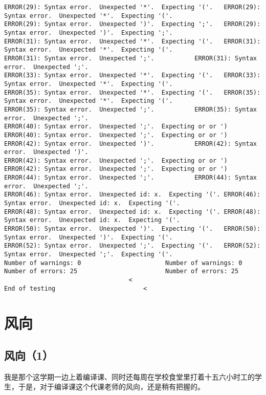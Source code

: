 \documentclass[12pt]{book}
\begin{document}
\begin{lstlisting}
ERROR(29): Syntax error.  Unexpected '*'.  Expecting '('.	ERROR(29): Syntax error.  Unexpected '*'.  Expecting '('.
ERROR(29): Syntax error.  Unexpected ')'.  Expecting ';'.	ERROR(29): Syntax error.  Unexpected ')'.  Expecting ';'.
ERROR(31): Syntax error.  Unexpected '*'.  Expecting '('.	ERROR(31): Syntax error.  Unexpected '*'.  Expecting '('.
ERROR(31): Syntax error.  Unexpected ';'.			ERROR(31): Syntax error.  Unexpected ';'.
ERROR(33): Syntax error.  Unexpected '*'.  Expecting '('.	ERROR(33): Syntax error.  Unexpected '*'.  Expecting '('.
ERROR(35): Syntax error.  Unexpected '*'.  Expecting '('.	ERROR(35): Syntax error.  Unexpected '*'.  Expecting '('.
ERROR(35): Syntax error.  Unexpected ';'.			ERROR(35): Syntax error.  Unexpected ';'.
ERROR(40): Syntax error.  Unexpected ';'.  Expecting or or ')	ERROR(40): Syntax error.  Unexpected ';'.  Expecting or or ')
ERROR(42): Syntax error.  Unexpected ')'.			ERROR(42): Syntax error.  Unexpected ')'.
ERROR(42): Syntax error.  Unexpected ';'.  Expecting or or ')	ERROR(42): Syntax error.  Unexpected ';'.  Expecting or or ')
ERROR(44): Syntax error.  Unexpected ';'.			ERROR(44): Syntax error.  Unexpected ';'.
ERROR(46): Syntax error.  Unexpected id: x.  Expecting '('.	ERROR(46): Syntax error.  Unexpected id: x.  Expecting '('.
ERROR(48): Syntax error.  Unexpected id: x.  Expecting '('.	ERROR(48): Syntax error.  Unexpected id: x.  Expecting '('.
ERROR(50): Syntax error.  Unexpected ')'.  Expecting '('.	ERROR(50): Syntax error.  Unexpected ')'.  Expecting '('.
ERROR(52): Syntax error.  Unexpected ';'.  Expecting '('.	ERROR(52): Syntax error.  Unexpected ';'.  Expecting '('.
Number of warnings: 0						Number of warnings: 0
Number of errors: 25						Number of errors: 25
							      <
End of testing					      <
\end{lstlisting}

\chapter{风向}
\label{sec-50}
\section{风向（1）}
\label{sec-50-1}

我是那个这学期一边上着编译课、同时还每周在学校食堂里打着十五六小时工的学生，于是，对于编译课这个代课老师的风向，还是稍有把握的。
\end{document}
